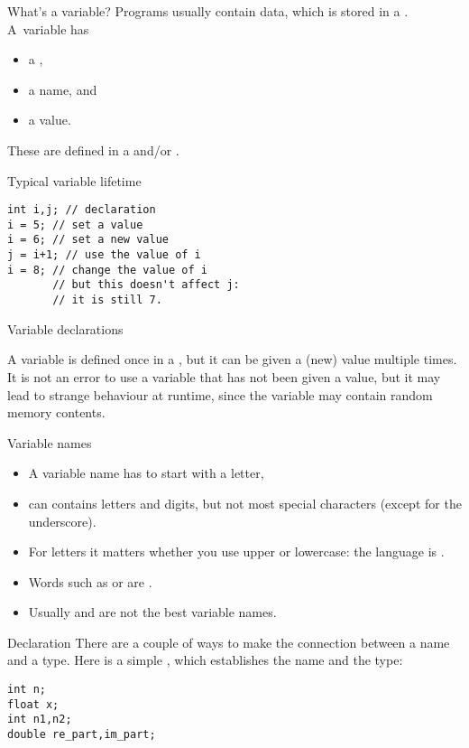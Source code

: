 \begin{slide}{What's a variable?}
  \label{sl:declaration}
  Programs usually contain data, which is stored in a
  . A~variable has
  \begin{itemize}
  \item a ,
  \item a name, and
  \item a value.
  \end{itemize}
  These are defined in a  and/or
  .
\end{slide}

\begin{block}{Typical variable lifetime}
  \label{sl:varlife}
\begin{verbatim}
int i,j; // declaration
i = 5; // set a value
i = 6; // set a new value
j = i+1; // use the value of i
i = 8; // change the value of i
       // but this doesn't affect j:
       // it is still 7.
\end{verbatim}
\end{block}

 {Variable declarations}

A variable is defined once
in a ,
but it can be given a (new) value multiple
times. It is not an error to use a variable that has not been given a
value, but it may lead to strange behaviour at runtime, since the
variable may contain random memory contents.

\begin{block}{Variable names}
  \label{sl:varname}
  \begin{itemize}
  \item
    A variable name has to start with a letter,
  \item can contains letters and  digits, but not most
    special characters (except for the underscore).
  \item For letters it matters
    whether you use upper or lowercase: the language is .
  \item Words such as  or  are .
  \item Usually  and  are not the best variable names.
  \end{itemize}
\end{block}

\begin{block}{Declaration}
  \label{sl:declare-example}
  There are a couple of ways to make the connection between a name and a
  type. Here is a simple
  , which establishes the name
  and the type:
\begin{verbatim}
int n;
float x;
int n1,n2;
double re_part,im_part;
\end{verbatim}
\end{block}


